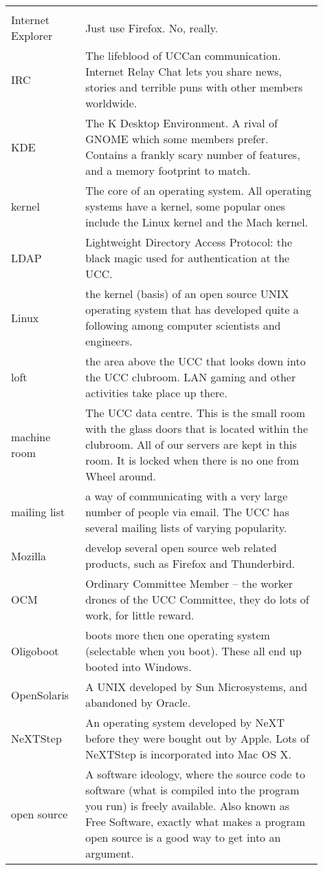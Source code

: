 \pagebreak

\small{
\begin{tabular}{p{0.2\linewidth}|p{0.7\linewidth}}
	\rowcolor{black} \color{white}{Term} & \color{white}{Translation} \\

Internet Explorer &
Just use Firefox. No, really. \\
IRC &
The lifeblood of UCCan communication. Internet Relay Chat lets you share news, stories and terrible puns with other members worldwide. \\
KDE &
The K Desktop Environment. A rival of GNOME which some members prefer. Contains a frankly scary number of features, and a memory footprint to match. \\
kernel &
The core of an operating system. All operating systems have a kernel, some popular ones include the Linux kernel and the Mach kernel. \\
LDAP &
Lightweight Directory Access Protocol: the black magic used for authentication at the UCC. \\
Linux &
the kernel (basis) of an open source UNIX operating system that has developed quite a following among computer scientists and engineers. \\
loft &
the area above the UCC that looks down into the UCC clubroom. LAN gaming and other activities take place up there. \\
machine room &
The UCC data centre. This is the small room with the glass doors that is located within the clubroom. All of our servers are kept in this room. It is locked when there is no one from Wheel around. \\
mailing list &
a way of communicating with a very large number of people via email. The UCC has several mailing lists of varying popularity. \\
Mozilla &
develop several open source web related products, such as Firefox and Thunderbird. \\
OCM &
Ordinary Committee Member -- the worker drones of the UCC Committee, they do lots of work, for little reward. \\
Oligoboot &
boots more then one operating system (selectable when you boot). These all end up booted into Windows. \\

OpenSolaris &
A UNIX developed by Sun Microsystems, and abandoned by Oracle. \\
NeXTStep &
An operating system developed by NeXT before they were bought out by Apple. Lots of NeXTStep is incorporated into Mac OS X. \\
open source &
A software ideology, where the source code to software (what is compiled into the program you run) is freely available. Also known as Free Software, exactly what makes a program open source is a good way to get into an argument. \\


\end{tabular}}

